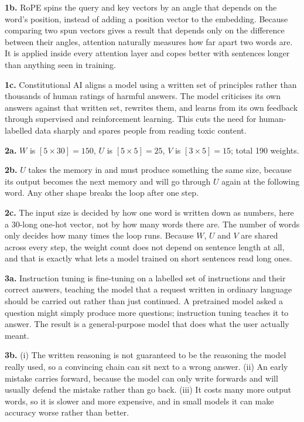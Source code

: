 \documentclass[11pt]{article}
\begin{document}
\textbf{1b.} RoPE spins the query and key vectors by an angle that depends on the word's
position, instead of adding a position vector to the embedding. Because comparing two spun
vectors gives a result that depends only on the difference between their angles, attention
naturally measures how far apart two words are. It is applied inside every attention layer and
copes better with sentences longer than anything seen in training.

\textbf{1c.} Constitutional AI aligns a model using a written set of principles rather than
thousands of human ratings of harmful answers. The model criticises its own answers against
that written set, rewrites them, and learns from its own feedback through supervised and
reinforcement learning. This cuts the need for human-labelled data sharply and spares people
from reading toxic content.

\textbf{2a.} $W$ is $[5\times30]=150$, $U$ is $[5\times5]=25$, $V$ is $[3\times5]=15$; total
190 weights.

\textbf{2b.} $U$ takes the memory in and must produce something the same size, because its
output becomes the next memory and will go through $U$ again at the following word. Any other
shape breaks the loop after one step.

\textbf{2c.} The input size is decided by how one word is written down as numbers, here a
30-long one-hot vector, not by how many words there are. The number of words only decides how
many times the loop runs. Because $W$, $U$ and $V$ are shared across every step, the weight
count does not depend on sentence length at all, and that is exactly what lets a model trained
on short sentences read long ones.

\textbf{3a.} Instruction tuning is fine-tuning on a labelled set of instructions and their
correct answers, teaching the model that a request written in ordinary language should be
carried out rather than just continued. A pretrained model asked a question might simply
produce more questions; instruction tuning teaches it to answer. The result is a
general-purpose model that does what the user actually meant.

\textbf{3b.} (i) The written reasoning is not guaranteed to be the reasoning the model really
used, so a convincing chain can sit next to a wrong answer. (ii) An early mistake carries
forward, because the model can only write forwards and will usually defend the mistake rather
than go back. (iii) It costs many more output words, so it is slower and more expensive, and
in small models it can make accuracy worse rather than better.
\end{document}
